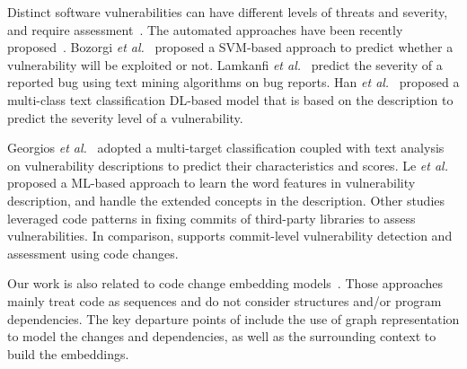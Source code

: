  Distinct software
vulnerabilities can have different levels of threats and severity, and
require
assessment~\cite{nayak2014some,le2019automated,khan2018review}.
The automated approaches have been recently
proposed~\cite{bozorgi2010beyond,allodi2014comparing,deepCVA-ase21}.
Bozorgi {\em et al.}~\cite{bozorgi2010beyond} proposed a SVM-based
approach to predict whether a vulnerability will be exploited or not.
Lamkanfi {\em et al.}~\cite{lamkanfi2010predicting} predict the
severity of a reported bug using text mining algorithms on bug reports.
%
Han {\em et al.}~\cite{han2017learning} proposed a multi-class text
classification DL-based model that is based on the
description to predict the severity level of a vulnerability.

Georgios {\em et al.}~\cite{spanos2018multi} adopted a multi-target
classification coupled with text analysis on vulnerability
descriptions to predict their characteristics and scores.
Le {\em et al.}~\cite{le2019automated} proposed a ML-based approach to
learn the word features in vulnerability description,
and handle the extended concepts in the description.
Other studies~\cite{ponta2018beyond,ponta2020detection} leveraged code
patterns in fixing commits of third-party libraries to assess
vulnerabilities. In comparison,
{\tool} supports commit-level vulnerability detection and assessment
using code changes.


 Our work is also related to
code change embedding models~\cite{cc2vec,commit2vec}. Those
approaches mainly treat code as sequences and do not consider
structures and/or program dependencies. The key departure points of
{\tool} include the use of graph representation to model the changes
and dependencies, as well as the surrounding context to build the
embeddings.
